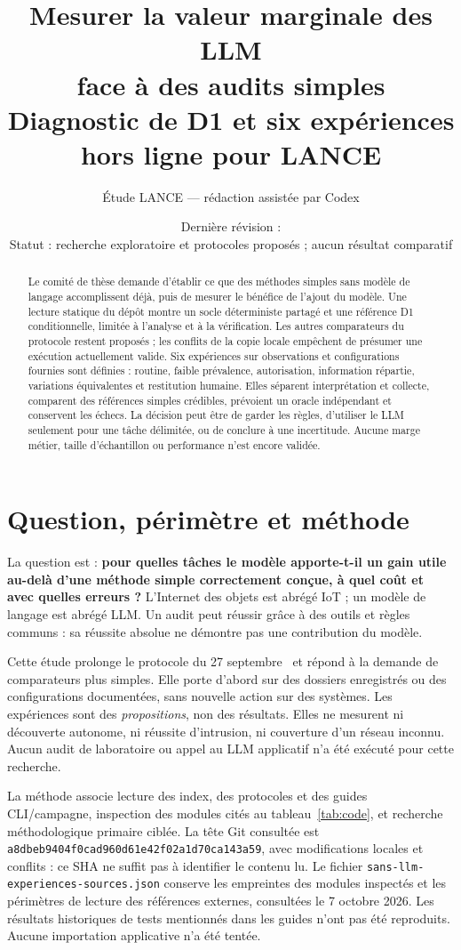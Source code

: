 \documentclass[11pt,a4paper]{article}
\title{Mesurer la valeur marginale des LLM\\face à des audits simples\\
 \large Diagnostic de D1 et six expériences hors ligne pour LANCE}
\author{Étude LANCE --- rédaction assistée par Codex}
\date{Dernière révision : \revision\\
 \small Statut : recherche exploratoire et protocoles proposés ; aucun résultat comparatif}
\newcommand{\fichier}[1]{\nolinkurl{#1}}
\begin{document}
\maketitle
\begin{abstract}
Le comité de thèse demande d'établir ce que des méthodes simples sans modèle
de langage accomplissent déjà, puis de mesurer le bénéfice de l'ajout du modèle.
Une lecture statique du dépôt montre un socle déterministe partagé et une
référence D1 conditionnelle, limitée à l'analyse et à la vérification. Les autres
comparateurs du protocole restent proposés ; les conflits de la copie locale
empêchent de présumer une exécution actuellement valide. Six expériences sur
observations et configurations fournies sont définies : routine, faible
prévalence, autorisation, information répartie, variations équivalentes et
restitution humaine. Elles séparent interprétation et collecte, comparent des
références simples crédibles, prévoient un oracle indépendant et conservent les
échecs. La décision peut être de garder les règles, d'utiliser le LLM seulement
pour une tâche délimitée, ou de conclure à une incertitude. Aucune marge métier,
taille d'échantillon ou performance n'est encore validée.
\end{abstract}
\tableofcontents

\section{Question, périmètre et méthode}
La question est : \textbf{pour quelles tâches le modèle apporte-t-il un gain
utile au-delà d'une méthode simple correctement conçue, à quel coût et avec
quelles erreurs ?} L'Internet des objets est abrégé IoT ; un modèle de langage
est abrégé LLM. Un audit peut réussir grâce à des outils et règles communs :
sa réussite absolue ne démontre pas une contribution du modèle.

Cette étude prolonge le protocole du 27 septembre~\cite{local} et répond à la
demande de comparateurs plus simples. Elle porte d'abord sur des dossiers
enregistrés ou des configurations documentées, sans nouvelle action sur des
systèmes. Les expériences sont des \emph{propositions}, non des résultats.
Elles ne mesurent ni découverte autonome, ni réussite d'intrusion, ni couverture
d'un réseau inconnu. Aucun audit de laboratoire ou appel au LLM applicatif
n'a été exécuté pour cette recherche.

La méthode associe lecture des index, des protocoles et des guides CLI/campagne,
inspection des modules cités au tableau~\ref{tab:code}, et recherche
méthodologique primaire ciblée. La tête Git consultée est
\fichier{a8dbeb9404f0cad960d61e42f02a1d70ca143a59}, avec modifications locales
et conflits : ce SHA ne suffit pas à identifier le contenu lu. Le fichier
\fichier{sans-llm-experiences-sources.json} conserve les empreintes des
modules inspectés et les périmètres de lecture des références externes, consultées
le 7 octobre 2026. Les résultats historiques de tests mentionnés dans les guides
n'ont pas été reproduits. Aucune importation applicative n'a été tentée.
\end{document}
